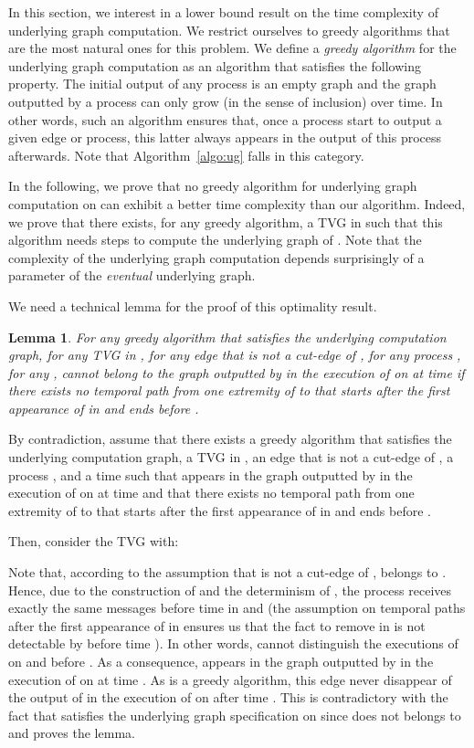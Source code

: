 \documentclass{article}
\newtheorem{lemma}{Lemma}
\newenvironment{proof}{{\bf Proof. } }{{\hfill }}
\begin{document}
In this section, we interest in a lower bound result on the time complexity of underlying graph computation. We restrict ourselves to greedy algorithms that are the most natural ones for this problem. We define a {\em greedy algorithm} for the underlying graph computation as an algorithm that satisfies the following property. The initial output of any process is an empty graph and the graph outputted by a process can only grow (in the sense of inclusion) over time. In other words, such an algorithm ensures that, once a process start to output a given edge or process, this latter always appears in the output of this process afterwards. Note that Algorithm~\ref{algo:ug} falls in this category.

In the following, we prove that no greedy algorithm for underlying graph computation on  can exhibit a better time complexity than our algorithm. Indeed, we prove that there exists, for any greedy algorithm, a TVG  in  such that this algorithm needs  steps to compute the underlying graph of . Note that the complexity of the underlying graph computation depends surprisingly of a parameter of the \emph{eventual} underlying graph. 

We need a technical lemma for the proof of this optimality result.

\begin{lemma}\label{lem:optimality}
For any greedy algorithm  that satisfies the underlying computation graph, for any TVG  in , for any edge  that is not a cut-edge of , for any process , for any ,  cannot belong to the graph outputted by  in the execution of  on  at time  if there exists no temporal path from one extremity of  to  that starts after the first appearance of  in  and ends before .
\end{lemma}

\begin{proof}
By contradiction, assume that there exists a greedy algorithm  that satisfies the underlying computation graph, a TVG  in , an edge  that is not a cut-edge of , a process , and a time  such that  appears in the graph outputted by  in the execution of  on  at time  and that there exists no temporal path from one extremity of  to  that starts after the first appearance of  in  and ends before .

Then, consider the TVG  with:


Note that, according to the assumption that  is not a cut-edge of ,  belongs to . Hence, due to the construction of  and the determinism of , the process  receives exactly the same messages before time  in  and  (the assumption on temporal paths after the first appearance of  in  ensures us that the fact to remove  in  is not detectable by  before time ). In other words,  cannot distinguish the executions of  on  and  before . As a consequence,  appears in the graph outputted by  in the execution of  on  at time . As  is a greedy algorithm, this edge never disappear of the output of  in the execution of  on  after time . This is contradictory with the fact that  satisfies the underlying graph specification on  since  does not belongs to  and proves the lemma.
\end{proof}
\end{document}
